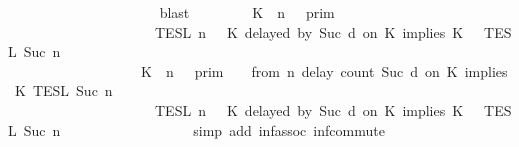 \begin{isabellebody}
\ \ \ \ \ \ \ \ \ \ \ \ \ \ \ \ \ \ \ {\isacharparenright}{\isacartoucheclose}\ \isamarkupfalse%
\ blast\isanewline
\ \ \isamarkupfalse%
\ \isamarkupfalse%
\ {\isacartoucheopen}{\isachardot}{\isachardot}{\isachardot}\ {\isacharequal}\ {\isacharparenleft}{\isasymlbrakk}{\isasymlbrakk}\ {\isacharparenleft}K\ {\isasymnot}{\isasymUp}\ n{\isacharparenright}\ {\isacharhash}\ {\isasymGamma}\ {\isasymrbrakk}{\isasymrbrakk}\isactrlsub p\isactrlsub r\isactrlsub i\isactrlsub m\ \isanewline
\ \ \ \ \ \ \ \ \ \ \ \ \ \ \ \ \ \ {\isasyminter}\ {\isasymlbrakk}{\isasymlbrakk}\ {\isasymPsi}\ {\isasymrbrakk}{\isasymrbrakk}\isactrlsub T\isactrlsub E\isactrlsub S\isactrlsub L\isactrlbsup {\isasymge}\ n\isactrlesup \ {\isasyminter}\ {\isasymlbrakk}{\isasymlbrakk}\ {\isacharparenleft}K\ delayed\ by\ {\isacharparenleft}Suc\ d{\isacharparenright}\ on\ K\ implies\ K\ {\isacharhash}\ {\isasymPhi}\ {\isasymrbrakk}{\isasymrbrakk}\isactrlsub T\isactrlsub E\isactrlsub S\isactrlsub L\isactrlbsup {\isasymge}\ Suc\ n\isactrlesup {\isacharparenright}\isanewline
\ \ \ \ \ \ \ \ \ \ \ \ \ \ \ \ \ {\isasymunion}\ {\isacharparenleft}{\isasymlbrakk}{\isasymlbrakk}\ {\isacharparenleft}K\ {\isasymUp}\ n{\isacharparenright}\ {\isacharhash}\ {\isasymGamma}\ {\isasymrbrakk}{\isasymrbrakk}\isactrlsub p\isactrlsub r\isactrlsub i\isactrlsub m\ \ {\isasyminter}\ {\isasymlbrakk}\ from\ n\ delay\ count\ {\isacharparenleft}Suc\ d{\isacharparenright}\ on\ K\ implies\ K\ {\isasymrbrakk}\isactrlsub T\isactrlsub E\isactrlsub S\isactrlsub L\isactrlbsup {\isasymge}\ Suc\ n\isactrlesup \isanewline
\ \ \ \ \ \ \ \ \ \ \ \ \ \ \ \ \ \ {\isasyminter}\ {\isasymlbrakk}{\isasymlbrakk}\ {\isasymPsi}\ {\isasymrbrakk}{\isasymrbrakk}\isactrlsub T\isactrlsub E\isactrlsub S\isactrlsub L\isactrlbsup {\isasymge}\ n\isactrlesup \ {\isasyminter}\ {\isasymlbrakk}{\isasymlbrakk}\ {\isacharparenleft}K\ delayed\ by\ {\isacharparenleft}Suc\ d{\isacharparenright}\ on\ K\ implies\ K\ {\isacharhash}\ {\isasymPhi}\ {\isasymrbrakk}{\isasymrbrakk}\isactrlsub T\isactrlsub E\isactrlsub S\isactrlsub L\isactrlbsup {\isasymge}\ Suc\ n\isactrlesup \isanewline
\ \ \ \ \ \ \ \ \ \ \ \ {\isacharparenright}{\isacartoucheclose}\isanewline
\ \ \ \ \isamarkupfalse%
\ {\isacharparenleft}simp\ add{\isacharcolon}\ inf{\isacharunderscore}assoc\ inf{\isacharunderscore}commute{\isacharparenright}\isanewline

\end{isabellebody}
